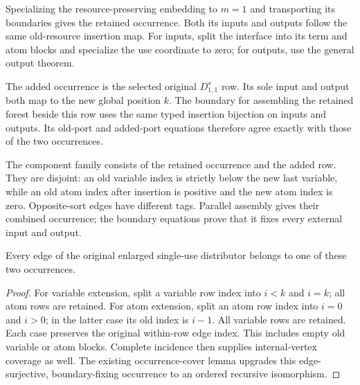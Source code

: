 Specializing the resource-preserving embedding to $m=1$ and transporting
its boundaries gives the retained occurrence. Both its inputs and outputs
follow the same old-resource insertion map. For inputs, split the interface
into its term and atom blocks and specialize the use coordinate to zero;
for outputs, use the general output theorem.

The added occurrence is the selected original $D_{1,1}^{s}$ row. Its sole
input and output both map to the new global position $k$. The boundary for
assembling the retained forest beside this row uses the same typed insertion
bijection on inputs and outputs. Its old-port and added-port equations
therefore agree exactly with those of the two occurrences.

The component family consists of the retained occurrence and the added row.
They are disjoint: an old variable index is strictly below the new last
variable, while an old atom index after insertion is positive and the new
atom index is zero. Opposite-sort edges have different tags. Parallel
assembly gives their combined occurrence; the boundary equations prove
that it fixes every external input and output.

\begin{lemma}
Every edge of the original enlarged single-use distributor belongs to one
of these two occurrences.
\end{lemma}
\begin{proof}
For variable extension, split a variable row index into $i<k$ and $i=k$;
all atom rows are retained. For atom extension, split an atom row index
into $i=0$ and $i>0$; in the latter case its old index is $i-1$. All variable
rows are retained. Each case preserves the original within-row edge index.
This includes empty old variable or atom blocks. Complete incidence then
supplies internal-vertex coverage as well. The existing occurrence-cover
lemma upgrades this edge-surjective, boundary-fixing occurrence to an
ordered recursive isomorphism.
\end{proof}

